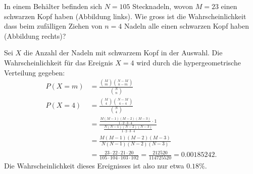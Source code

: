 In einem Behälter befinden sich $N=105$ Stecknadeln, wovon $M=23$ einen
schwarzen Kopf haben (Abbildung links).
Wie gross ist die Wahrscheinlichkeit dass beim zufälligen Ziehen von
$n=4$ Nadeln alle einen schwarzen Kopf haben (Abbildung rechts)?
\begin{center}
\end{center}



\begin{loesung}
Sei $X$ die Anzahl der Nadeln mit schwarzem Kopf in der Auswahl.
Die Wahrscheinlichkeit für das Ereignis $X=4$ wird durch die
hypergeometrische Verteilung gegeben:
\begin{align*}
P(X=m)
&=
\frac{ \binom{M}{m} \binom{N-M}{n-m} }{ \binom{N}{n} }
\\
P(X=4)
&=
\frac{ \binom{M}{4} \binom{N-M}{4-4} }{ \binom{N}{4} }
\\
&=
\frac{
\frac{M(M-1)(M-2)(M-3)}{1\cdot 2 \cdot 3\cdot 4}\cdot 1
}{
\frac{N(N-1)(N-2)(N-3)}{1\cdot 2 \cdot 3\cdot 4}
}
\\
&=
\frac{
M(M-1)(M-2)(M-3)
}{
N(N-1)(N-2)(N-3)
}
\\
&=
\frac{
23\cdot 22\cdot 21\cdot 20
}{
105\cdot 104\cdot 103\cdot 102
}
=
\frac{
212520
}{
114725520
}
=
0.00185242.
\end{align*}
Die Wahrscheinlichkeit dieses Ereignisses ist also nur etwa $0.18\%$.
\end{loesung}
